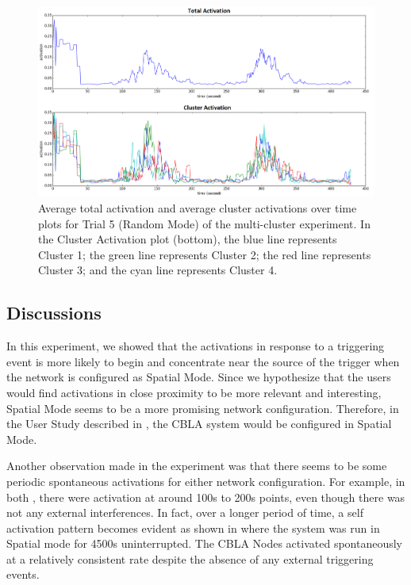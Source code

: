 \begin{figure} [!htb]
	\centering
	\includegraphics[width=1.0\textwidth]{"fig/validations/cbla_random_2015-11-16_15-14-04 - Metrics"}
	\caption[Average total activation and average cluster activations over time plots for Trial 5 (Random Mode) of the multi-cluster experiment]{Average total activation and average cluster activations over time plots for Trial 5 (Random Mode) of the multi-cluster experiment. In the Cluster Activation plot (bottom), the blue line represents Cluster 1; the green line represents Cluster 2; the red line represents Cluster 3; and the cyan line represents Cluster 4.}
	\label{fig:multi-cluster-results-random-2}
\end{figure}

\subsection{Discussions}

In this experiment, we showed that the activations in response to a triggering event is more likely to begin and concentrate near the source of the trigger when the network is configured as Spatial Mode. Since we hypothesize that the users would find activations in close proximity to be more relevant and interesting, Spatial Mode seems to be a more promising network configuration. Therefore, in the User Study described in , the CBLA system would be configured in Spatial Mode. 

Another observation made in the experiment was that there seems to be some periodic spontaneous activations for either network configuration. For example, in both , there were activation at around 100s to 200s points, even though there was not any external interferences. In fact, over a longer period of time, a self activation pattern becomes evident as shown in  where the system was run in Spatial mode for 4500s uninterrupted. The CBLA Nodes activated spontaneously at a relatively consistent rate despite the absence of any external triggering events. 

